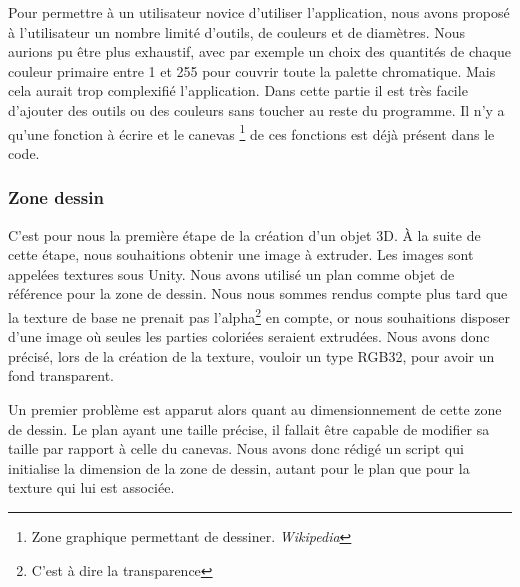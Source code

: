 \documentclass[a4paper,11pt]{article}
\begin{document}
				Pour permettre à un utilisateur novice d'utiliser l'application, nous avons proposé à l'utilisateur un nombre limité d'outils, de couleurs et de diamètres. Nous aurions pu être plus exhaustif, avec par exemple un choix des quantités de chaque couleur primaire entre 1 et 255 pour couvrir toute la palette chromatique. Mais cela aurait trop complexifié l'application.
				Dans cette partie il est très facile d'ajouter des outils ou des couleurs sans toucher au reste du programme. Il n'y a qu'une fonction à écrire et le canevas \footnote{Zone graphique permettant de dessiner. \emph{Wikipedia}} de ces fonctions est déjà présent dans le code.
			\subsubsection{Zone dessin}
			
			C'est pour nous la première étape de la création d'un objet 3D. À la suite de cette étape, nous souhaitions obtenir une image à extruder. Les images sont appelées textures sous Unity. Nous avons utilisé un plan comme objet de référence pour la zone de dessin. Nous nous sommes rendus compte plus tard que la texture de base ne prenait pas l'alpha\footnote{C'est à dire la transparence} en compte, or nous souhaitions disposer d'une image où seules les parties coloriées seraient extrudées. Nous avons donc précisé, lors de la création de la texture, vouloir un type RGB32, pour avoir un fond transparent.
			
			Un premier problème est apparut alors quant au dimensionnement de cette zone de dessin. Le plan ayant une taille précise, il fallait être capable de modifier sa taille par rapport à celle du canevas. Nous avons donc rédigé un script qui initialise la dimension de la zone de dessin, autant pour le plan que pour la texture qui lui est associée.
			
\end{document}
